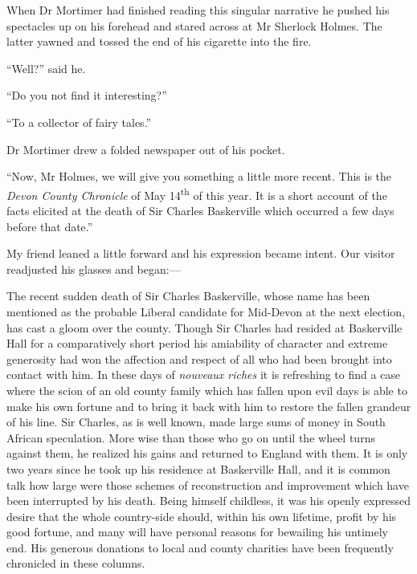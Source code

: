 \documentclass[paper=5.5in:8.5in,BCOR=7mm,twoside,DIV=calc,12pt,usegeometry,openany,chapterprefix,endperiod,headings=big]{scrbook} %
\begin{document}
When Dr Mortimer had finished reading this singular narrative he pushed his spectacles up on his forehead and stared across at Mr Sherlock Holmes. The latter yawned and tossed the end of his cigarette into the fire.

\enquote{Well?} said he.

\enquote{Do you not find it interesting?}

\enquote{To a collector of fairy tales.}

Dr Mortimer drew a folded newspaper out of his pocket.

\enquote{Now, Mr Holmes, we will give you something a little more recent. This is the \textit{Devon County Chronicle} of May 14\textsuperscript{th} of this year. It is a short account of the facts elicited at the death of Sir Charles Baskerville which occurred a few days before that date.}

My friend leaned a little forward and his expression became intent. Our visitor readjusted his glasses and began:--- \\

\vfill

\textsf{The recent sudden death of Sir Charles Baskerville, whose name has been mentioned as the probable Liberal candidate for Mid-Devon at the next election, has cast a gloom over the county. Though Sir Charles had resided at Baskerville Hall for a comparatively short period his amiability of character and extreme generosity had won the affection and respect of all who had been brought into contact with him. In these days of \emph{nouveaux riches} it is refreshing to find a case where the scion of an old county family which has fallen upon evil days is able to make his own fortune and to bring it back with him to restore the fallen grandeur of his line. Sir Charles, as is well known, made large sums of money in South African speculation. More wise than those who go on until the wheel turns against them, he realized his gains and returned to England with them. It is only two years since he took up his residence at Baskerville Hall, and it is common talk how large were those schemes of reconstruction and improvement which have been interrupted by his death. Being himself childless, it was his openly expressed desire that the whole country-side should, within his own lifetime, profit by his good fortune, and many will have personal reasons for bewailing his untimely end. His generous donations to local and county charities have been frequently chronicled in these columns.}
\end{document}
